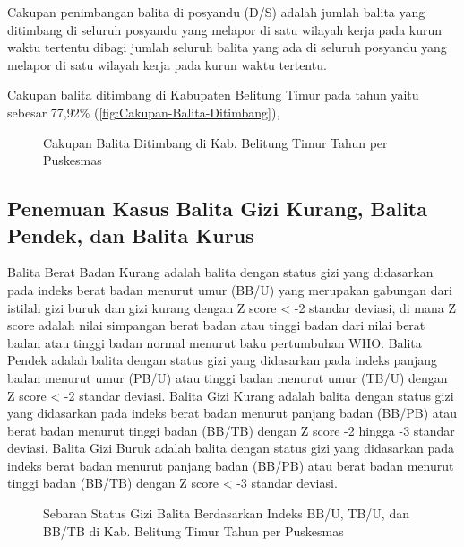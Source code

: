 Cakupan penimbangan balita di posyandu (D/S) adalah jumlah balita
yang ditimbang di seluruh posyandu yang melapor di satu wilayah kerja
pada kurun waktu tertentu dibagi jumlah seluruh balita yang ada di
seluruh posyandu yang melapor di satu wilayah kerja pada kurun waktu
tertentu.

Cakupan balita ditimbang di Kabupaten Belitung Timur pada tahun \tP yaitu sebesar 77,92\% (\autoref{fig:Cakupan-Balita-Ditimbang}), %

\begin{figure}[H]
  \centering
  \caption{Cakupan Balita Ditimbang di Kab. Belitung Timur Tahun \tP per Puskesmas}
  \label{fig:Cakupan-Balita-Ditimbang}
\end{figure}


\subsection{Penemuan Kasus Balita Gizi Kurang, Balita Pendek, dan Balita Kurus}
\label{subsec:Penemuan-Kasus-Gizi-Kurang}
Balita Berat Badan Kurang adalah balita dengan status gizi yang didasarkan pada indeks berat badan menurut umur (BB/U) yang merupakan gabungan dari istilah gizi buruk dan gizi kurang dengan Z score < -2 standar deviasi, di mana Z score adalah nilai simpangan berat badan atau tinggi badan dari nilai berat badan atau tinggi badan normal menurut baku pertumbuhan WHO.
Balita Pendek adalah balita dengan status gizi yang didasarkan pada indeks panjang badan menurut umur (PB/U) atau tinggi badan menurut umur (TB/U) dengan Z score < -2 standar deviasi.
Balita Gizi Kurang adalah balita dengan status gizi yang didasarkan pada indeks berat badan menurut panjang badan (BB/PB) atau berat badan menurut tinggi badan (BB/TB) dengan Z score -2 hingga -3 standar deviasi.
Balita Gizi Buruk adalah balita dengan status gizi yang didasarkan pada indeks berat badan menurut panjang badan (BB/PB) atau berat badan menurut tinggi badan (BB/TB) dengan Z score < -3 standar deviasi.

\begin{figure}[H]
  \centering
  \caption{Sebaran Status Gizi Balita Berdasarkan Indeks BB/U, TB/U, dan BB/TB di Kab. Belitung Timur Tahun \tP per
Puskesmas}
  \label{fig:Status-Gizi-Balita}
\end{figure}

